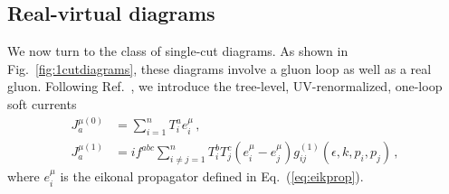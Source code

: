 \documentclass[a4paper,11pt]{article}
\numberwithin{equation}{section}
\begin{document}
\subsection{Real-virtual diagrams}
\label{sec:realvirt}

We now turn to the class of single-cut diagrams. As shown in
Fig.~\ref{fig:1cutdiagrams}, these diagrams involve a gluon loop as well as a real
gluon. 
%
Following Ref.~\cite{Bierenbaum:2011gg}, we introduce the tree-level,
UV-renormalized, one-loop soft currents
%
\begin{align}
  J_a^{\mu (0)} & = \sum_{i=1}^n T_i^a e_i^\mu\,,
  \\
  J_a^{\mu (1)} & = i f^{abc} \sum_{i\neq j=1}^n T_i^b T_j^c 
                    \left(e_i^\mu-e_j^\mu\right) 
		    g_{ij}^{(1)}(\epsilon,k, p_i, p_j)\,,
\end{align}
%
where $e_i^\mu$ is the eikonal propagator defined in Eq.~(\ref{eq:eikprop}).
\end{document}
